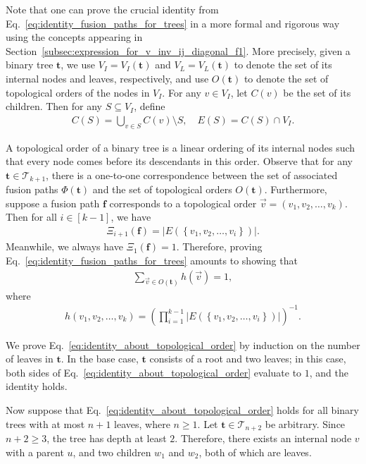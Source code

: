 \documentclass[superscriptaddress,onecolumn,nofootinbib,longbibliography,a4paper,accepted=2026-09-29]{quantumarticle}
\theoremstyle{plain}
\theoremstyle{definition}
\numberwithin{thm}{section}
\numberwithin{assumption}{section}
\numberwithin{lemma}{section}
\numberwithin{prop}{section}
\numberwithin{cor}{section}
\numberwithin{definition}{section}
\numberwithin{rmk}{section}
\numberwithin{equation}{section}
\renewcommand{\v}[1]{\ensuremath{\boldsymbol #1}}
\newcommand{\lrb}[1]{\left ( #1 \right )}
\newcommand{\lrcb}[1]{\left \{ #1 \right \}}
\newcommand{\mbt}{\mathbf{t}}
\begin{document}
Note that one can prove the crucial identity from Eq.~\eqref{eq:identity_fusion_paths_for_trees} in a more formal and rigorous way using the concepts appearing in Section~\ref{subsec:expression_for_v_inv_ij_diagonal_f1}. More precisely, given a binary tree $\mbt$, we use $V_I=V_I(\mbt)$ and $V_L=V_L(\mbt)$ to denote the set of its internal nodes and leaves, respectively, and use $O(\mbt)$ to denote the set of topological orders of the nodes in $V_I$. For any $v \in V_I$, let $C(v)$ be the set of its children. Then for any $S \subseteq V_I$, define 
\begin{align}
C(S)=\bigcup\limits_{v \in S} C(v) \setminus S, \quad    
E(S)=C(S)\cap V_I.
\end{align}

A topological order of a binary tree is a linear ordering of its internal nodes such that every node comes before its descendants in this order. Observe that for any $\mbt \in \mathcal{T}_{k+1}$, there is a one-to-one correspondence between the set of associated fusion paths $\Phi(\mbt)$
and the set of topological orders $O(\mbt)$. Furthermore, suppose a fusion path $\v{f}$ corresponds to a topological order $\vec v=(v_1, v_2, \dots, v_k)$. Then for all $i \in [k-1]$,  we have
\begin{align}
    \Xi_{i+1}(\v{f}) = |E(\lrcb{v_1, v_2,\dots, v_i})|.
\end{align}
Meanwhile, we always have $\Xi_{1}(\v{f})=1$. Therefore, proving Eq.~\eqref{eq:identity_fusion_paths_for_trees} amounts to showing that
\begin{align}
    \sum_{\vec v \in O(\mbt)} h(\vec v) = 1,
    \label{eq:identity_about_topological_order}
\end{align}
where
\begin{align}
h(v_1,v_2,\dots,v_{k}) = \lrb{\prod_{i=1}^{k-1} |E(\lrcb{v_1, v_2, \dots, v_i})|}^{-1}.
\end{align}


We prove Eq.~\eqref{eq:identity_about_topological_order} by induction on the number of leaves in $\mbt$. In the base case, $\mbt$ consists of a root and two leaves; in this case, both sides of Eq.~\eqref{eq:identity_about_topological_order} evaluate to $1$, and the identity holds.

Now suppose that Eq.~\eqref{eq:identity_about_topological_order} holds for all binary trees with at most $n+1$ leaves, where $n \ge 1$. Let $\mbt \in \mathcal{T}_{n+2}$ be arbitrary. Since $n+2 \ge 3$, the tree has depth at least $2$. Therefore, there exists an internal node $v$ with a parent $u$, and two children $w_1$ and $w_2$, both of which are leaves. 
\end{document}

